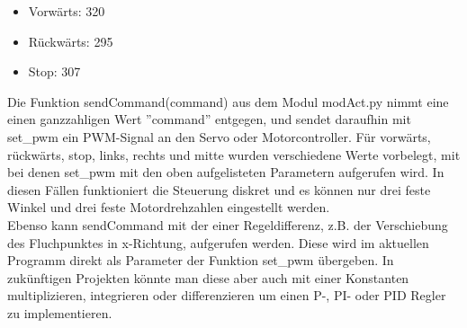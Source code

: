 \begin{itemize}
	\item Vorwärts: 320
	\item Rückwärts: 295
	\item Stop: 307
\end{itemize}


Die Funktion sendCommand(command) aus dem Modul modAct.py nimmt eine einen ganzzahligen Wert ''command'' entgegen, und sendet daraufhin mit set\_pwm ein PWM-Signal an den Servo oder Motorcontroller. Für vorwärts, rückwärts, stop, links, rechts und mitte wurden verschiedene Werte vorbelegt, mit bei denen set\_pwm mit den oben aufgelisteten Parametern aufgerufen wird. In diesen Fällen funktioniert die Steuerung diskret und es können nur drei feste Winkel und drei feste Motordrehzahlen eingestellt werden.\\
Ebenso kann sendCommand mit der einer Regeldifferenz, z.B. der Verschiebung des Fluchpunktes in x-Richtung, aufgerufen werden. Diese wird im aktuellen Programm direkt als Parameter der Funktion set\_pwm übergeben. In zukünftigen Projekten könnte man diese aber auch mit einer Konstanten multiplizieren, integrieren oder differenzieren um einen P-, PI- oder PID Regler zu implementieren.


